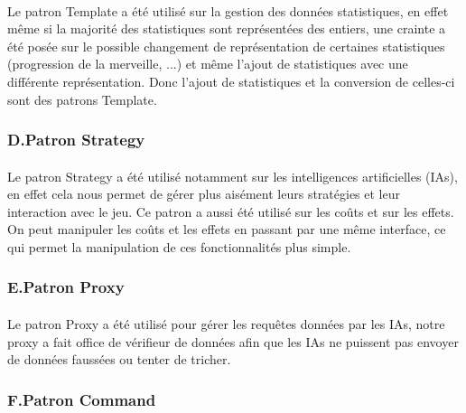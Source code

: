 \documentclass[13pt ,a4paper ]{report}
\begin{document}
\begin{multicols}{2}
		\paragraph{}
Le patron Template a été utilisé sur la gestion des données statistiques, en effet même si la majorité des statistiques sont représentées des entiers, une crainte a été posée sur le possible changement de représentation de certaines statistiques (progression de la merveille, ...) et même l’ajout de statistiques avec une différente représentation. Donc l’ajout de statistiques et la conversion de celles-ci sont des patrons Template.

		\subsubsection{D.\hspace*{0.5cm}Patron Strategy}
		\paragraph{}
      		Le patron Strategy a été utilisé notamment sur les intelligences artificielles (IAs), en effet cela nous permet de gérer plus aisément leurs stratégies et leur interaction avec le jeu.
Ce patron a aussi été utilisé sur les coûts et sur les effets. On peut manipuler les coûts et les effets en passant par une même interface, ce qui permet la manipulation de ces fonctionnalités plus simple.

		\subsubsection{E.\hspace*{0.5cm}Patron Proxy}
		\paragraph{}
Le patron Proxy a été utilisé pour gérer les requêtes données par les IAs, notre proxy a fait office de vérifieur de données afin que les IAs ne puissent pas envoyer de données faussées ou tenter de tricher.

		\subsubsection{F.\hspace*{0.5cm}Patron Command}
		\paragraph{}


\end{multicols}
\end{document}
